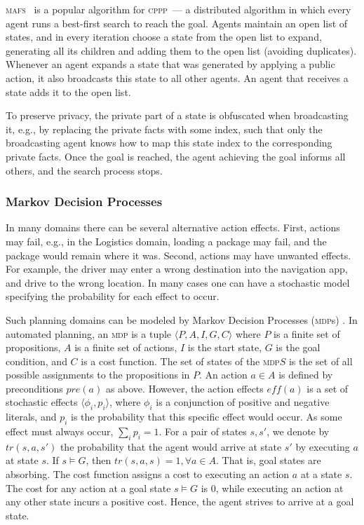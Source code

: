 \documentclass[letterpaper]{article} %
\newcommand{\mafs}{\textsc {mafs}\xspace}
\newcommand{\cppp}{\textsc {cppp}\xspace}
\newcommand{\mdps}{\textsc {mdp}s\xspace}
\newcommand{\mdp}{\textsc {mdp}\xspace}
\theoremstyle{remark}
\newcommand{\citep}[1]{\cite{#1}}
\begin{document}
\mafs\ \citep{nissim2014distributed} is a popular algorithm for \cppp\ --- a distributed algorithm in which every agent runs a best-first search to reach the goal. Agents maintain an open list of states, and in every iteration choose a state from the open list to expand, generating all its children and adding them to the open list (avoiding duplicates). Whenever an agent expands a state that was generated by applying a public action, it also broadcasts this state to all other agents. An agent that receives a state adds it to the open list.

To preserve privacy, the private part of a state is obfuscated when broadcasting it, e.g., by replacing the private facts with some index, such that only the broadcasting agent knows how to map this state index to the corresponding private facts. Once the goal is reached, the agent achieving the goal informs all others, and the search process stops.


\subsubsection{Markov Decision Processes}

In many domains there can be several alternative action effects. First, actions may fail, e.g., in the Logistics domain, loading a package may fail, and the package would remain where it was. Second, actions may have unwanted effects. For example, the driver may enter a wrong destination into the navigation app, and drive to the wrong location. In many cases one can have a stochastic model specifying the probability for each effect to occur.

Such planning domains can be modeled by Markov Decision Processes (\mdps) \cite{kolobov2012planning}. In automated planning, an \mdp is a tuple $\langle P,A,I,G,C \rangle$ where $P$ is a finite set of propositions, $A$ is a finite set of actions, $I$ is the start state, $G$ is the goal condition, and $C$ is a cost function. The set of states of the \mdp $S$ is the set of all possible assignments to the propositions in $P$.
An action $a\in A$ is defined by preconditions $pre(a)$ as above. However, the action effects $\mathit{eff}(a)$ is a set of stochastic effects $\langle \phi_i, p_i \rangle$, where $\phi_i$ is a conjunction of positive and negative literals, and $p_i$ is the probability that this specific effect would occur. As some effect must always occur, $\sum_i p_i = 1$. For a pair of states $s,s'$, we denote by $tr(s,a,s')$ the probability that the agent would arrive at state $s'$ by executing $a$ at state $s$. If $s\models G$, then $tr(s,a,s)=1, \forall a \in A$. That is, goal states are absorbing.
The cost function assigns a cost to executing an action $a$ at a state $s$. The cost for any action at a goal state $s \models G$ is $0$, while executing an action at any other state incurs a positive cost. Hence, the agent strives to arrive at a goal state.
\end{document}
